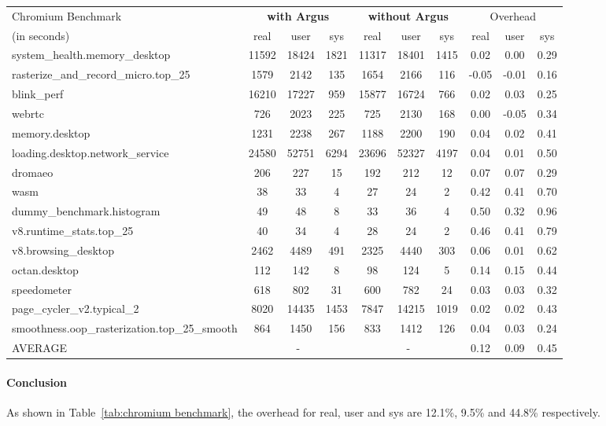 \begin{table*}[ht]
\begin{center}
\begin{tabular}{l|ccc|ccc|ccc}
	\hline
	\hline
Chromium Benchmark&\multicolumn{3}{c}{\textbf{with Argus}} & \multicolumn{3}{c}{\textbf{without Argus}} & \multicolumn{3}{c}{Overhead}\\
(in seconds)& real & user & sys & real & user & sys & real & user & sys \\
\hline
system\_health.memory\_desktop & 11592 & 18424 & 1821 & 11317 & 18401 & 1415 & 0.02 & 0.00 & 0.29\\
rasterize\_and\_record\_micro.top\_25 & 1579 & 2142 & 135 & 1654 & 2166 & 116 & -0.05 & -0.01 & 0.16\\
blink\_perf & 16210 & 17227 & 959 & 15877 & 16724 & 766 & 0.02 & 0.03 & 0.25\\
webrtc & 726 & 2023 & 225 & 725 & 2130 & 168 & 0.00 & -0.05 & 0.34\\
memory.desktop & 1231 & 2238 & 267 & 1188 & 2200 & 190 & 0.04 & 0.02 & 0.41\\
loading.desktop.network\_service & 24580 & 52751 & 6294 & 23696 & 52327 & 4197 & 0.04 & 0.01 & 0.50\\
dromaeo & 206 & 227 & 15 & 192 & 212 & 12 & 0.07 & 0.07 & 0.29\\
wasm & 38 & 33 & 4 & 27 & 24 & 2 & 0.42 & 0.41 & 0.70\\
dummy\_benchmark.histogram & 49 & 48 & 8 & 33 & 36 & 4 & 0.50 & 0.32 & 0.96\\
v8.runtime\_stats.top\_25 & 40 & 34 & 4 & 28 & 24 & 2 & 0.46 & 0.41 & 0.79\\
v8.browsing\_desktop & 2462 & 4489 & 491 & 2325 & 4440 & 303 & 0.06 & 0.01 & 0.62\\
octan.desktop & 112 & 142 & 8 & 98 & 124 & 5 & 0.14 & 0.15 & 0.44\\
speedometer & 618 & 802 & 31 & 600 & 782 & 24 & 0.03 & 0.03 & 0.32\\
page\_cycler\_v2.typical\_2 & 8020 & 14435 & 1453 & 7847 & 14215 & 1019 & 0.02 & 0.02 & 0.43\\
smoothness.oop\_rasterization.top\_25\_smooth & 864 & 1450 & 156 & 833 & 1412 & 126 & 0.04 & 0.03 & 0.24\\
\hline
AVERAGE & \multicolumn{3}{c}{-} &  \multicolumn{3}{c}{-}  & 0.12 & 0.09 & 0.45\\
\hline
\hline
\end{tabular}
\caption{Chromium benchmark}
\label{tab:chromium benchmark}
\end{center}
\end{table*}

\paragraph{Conclusion}
As shown in Table~\ref{tab:chromium benchmark}, the overhead for real, user and
sys are 12.1\%, 9.5\% and 44.8\% respectively.
